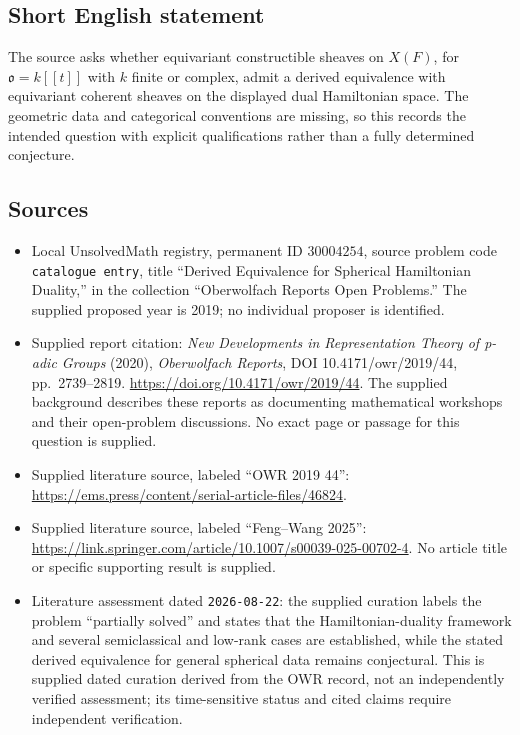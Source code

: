 \documentclass[11pt]{article}
\begin{document}
\subsection{Short English statement}
The source asks whether equivariant constructible sheaves on \(X(F)\), for \(\mathfrak o=k[[t]]\) with \(k\) finite or complex, admit a derived equivalence with equivariant coherent sheaves on the displayed dual Hamiltonian space. The geometric data and categorical conventions are missing, so this records the intended question with explicit qualifications rather than a fully determined conjecture.
\subsection{Sources}
\begin{itemize}
\item Local UnsolvedMath registry, permanent ID \(30004254\), source problem code \texttt{catalogue entry}, title ``Derived Equivalence for Spherical Hamiltonian Duality,'' in the collection ``Oberwolfach Reports Open Problems.'' The supplied proposed year is 2019; no individual proposer is identified.
\item Supplied report citation: \emph{New Developments in Representation Theory of p-adic Groups} (2020), \emph{Oberwolfach Reports}, DOI 10.4171/owr/2019/44, pp.\ 2739--2819. \url{https://doi.org/10.4171/owr/2019/44}. The supplied background describes these reports as documenting mathematical workshops and their open-problem discussions. No exact page or passage for this question is supplied.
\item Supplied literature source, labeled ``OWR 2019 44'': \url{https://ems.press/content/serial-article-files/46824}.
\item Supplied literature source, labeled ``Feng--Wang 2025'': \url{https://link.springer.com/article/10.1007/s00039-025-00702-4}. No article title or specific supporting result is supplied.
\item Literature assessment dated \texttt{2026-08-22}: the supplied curation labels the problem ``partially solved'' and states that the Hamiltonian-duality framework and several semiclassical and low-rank cases are established, while the stated derived equivalence for general spherical data remains conjectural. This is supplied dated curation derived from the OWR record, not an independently verified assessment; its time-sensitive status and cited claims require independent verification.
\end{itemize}
\end{document}
